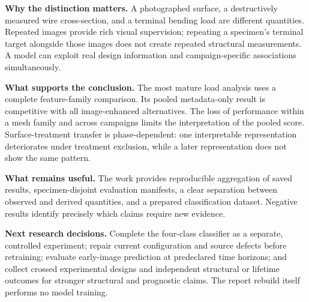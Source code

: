 \textbf{Why the distinction matters.} A photographed surface, a destructively measured wire cross-section, and a terminal bending load are different quantities. Repeated images provide rich visual supervision; repeating a specimen's terminal target alongside those images does not create repeated structural measurements. A model can exploit real design information and campaign-specific associations simultaneously.

\textbf{What supports the conclusion.} The most mature load analysis uses a complete feature-family comparison. Its pooled metadata-only result is competitive with all image-enhanced alternatives. The loss of performance within a mesh family and across campaigns limits the interpretation of the pooled score. Surface-treatment transfer is phase-dependent: one interpretable representation deteriorates under treatment exclusion, while a later representation does not show the same pattern.

\textbf{What remains useful.} The work provides reproducible aggregation of saved results, specimen-disjoint evaluation manifests, a clear separation between observed and derived quantities, and a prepared classification dataset. Negative results identify precisely which claims require new evidence.

\textbf{Next research decisions.} Complete the four-class classifier as a separate, controlled experiment; repair current configuration and source defects before retraining; evaluate early-image prediction at predeclared time horizons; and collect crossed experimental designs and independent structural or lifetime outcomes for stronger structural and prognostic claims. The report rebuild itself performs no model training.
